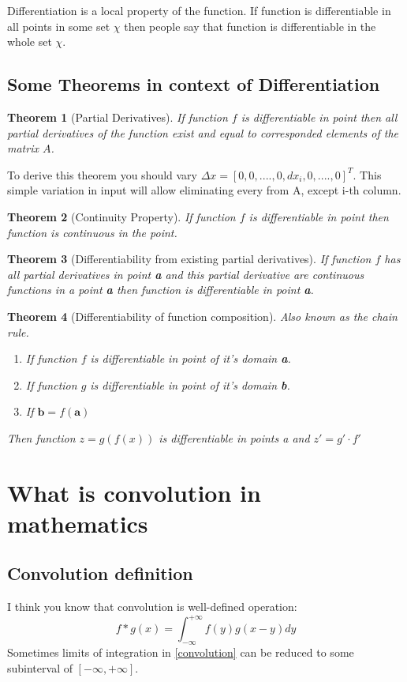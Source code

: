 \documentclass[12pt,a4paper]{article}
\theoremstyle{plain}
\newtheorem{theorem}{Theorem}[section]
\begin{document}
Differentiation is a local property of the function. If function is differentiable in all points in some set $\chi$ then people say that function is differentiable in the whole set $\chi$.
\\
\subsection{Some Theorems in context of Differentiation}
\begin{theorem} [Partial Derivatives]
 If function $f$ is differentiable in point then all partial derivatives of the function exist and equal to corresponded elements of the matrix $A$.
\end{theorem}
To derive this theorem you should vary \textbf{$\varDelta x = [0, 0, ...., 0, dx_i, 0, ...., 0]^T$}.
This simple variation in input will allow eliminating every from A, except i-th column.

\begin{theorem} [Continuity Property]
 If function $f$ is differentiable in point then function is continuous in the point.
\end{theorem}
\begin{theorem} [Differentiability from existing partial derivatives]
 If function $f$ has all partial derivatives in point \textbf{a} and this partial derivative are continuous functions in a point \textbf{a} then function is differentiable in point \textbf{a}.
\end{theorem}
\begin{theorem} [Differentiability of function composition] Also known as the chain rule.
 \begin{enumerate}
  \item  If function $f$ is differentiable in point of it's domain \textbf{a}.
  \item  If function $g$ is differentiable in point of it's domain \textbf{b}.
  \item  If $\textbf{b} = f(\textbf{a})$
 \end{enumerate}
 Then function $z=g(f(x))$ is differentiable in points \textit{a} and 
 $z' = g' \cdot f'$
\end{theorem}
\section{What is convolution in mathematics}
\subsection{Convolution definition}
I think you know that convolution is well-defined operation:
\begin{equation}\label{convolution}
f*g(x)=\int^{+\infty}_{-\infty} f(y)g(x-y)dy
\end{equation}
Sometimes limits of integration in \eqref{convolution} can be reduced to some subinterval of $[-\infty, +\infty]$.
\end{document}

